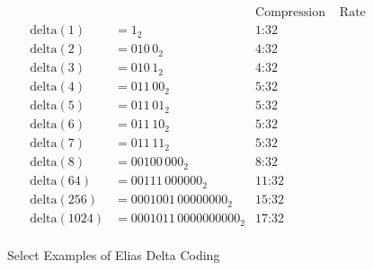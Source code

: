 \begin{figure}
	
	\centering
	\begin{align*}
						&		&\text{Compression}&\text{ Rate}\\
		\mathrm{delta}(1) &= 1_2  &\text{1:32} \\
		\mathrm{delta}(2) &= 010\,0_2 &\text{4:32} \\
		\mathrm{delta}(3) &= 010\,1_2 &\text{4:32} \\
		\mathrm{delta}(4) &= 011\,00_2 &\text{5:32} \\
		\mathrm{delta}(5) &= 011\,01_2 &\text{5:32} \\
		\mathrm{delta}(6) &= 011\,10_2 &\text{5:32} \\
		\mathrm{delta}(7) &= 011\,11_2 &\text{5:32} \\
		\mathrm{delta}(8) &= 00100\,000_2 &\text{8:32}\\
		\mathrm{delta}(64) &= 00111\,000000_2 &\text{11:32}\\
		\mathrm{delta}(256) &= 0001001\,00000000_2 &\text{15:32} \\
		\mathrm{delta}(1024) &= 0001011\,0000000000_2 &\text{17:32} \\
	\end{align*}
	
	\caption{Select Examples of Elias Delta Coding}
	\label{fig:bg-comp-delta-ex}
\end{figure}